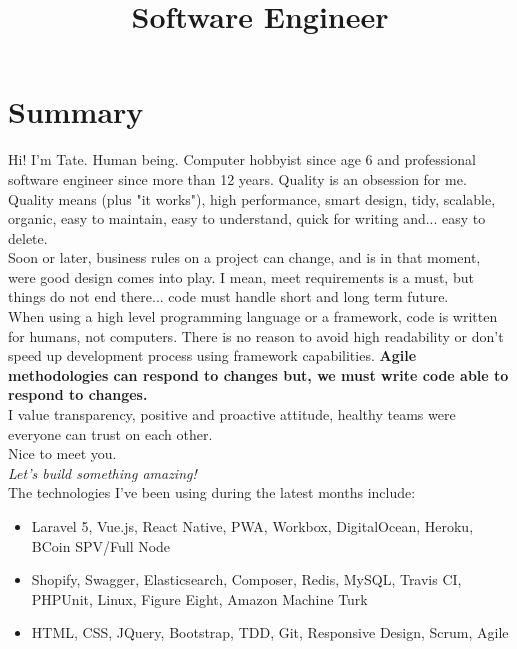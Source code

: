 \documentclass[11pt,a4paper,sans]{moderncv}        %
\title{Software Engineer}                               %
\begin{document}
\makecvtitle

\section{Summary}

Hi! I'm Tate. Human being. Computer hobbyist since age 6 and professional software engineer since more than 12 years.
Quality is an obsession for me. Quality means (plus "it works"), high performance, smart design, tidy, scalable, organic, easy to maintain, easy to understand, quick for writing and... easy to delete.\\

Soon or later, business rules on a project can change, and is in that moment, were good design comes into play.
I mean, meet requirements is a must, but things do not end there... code must handle short and long term future.\\

When using a high level programming language or a framework, code is written for humans, not computers. There is no reason to avoid high readability or don't speed up development process using framework capabilities.
\textbf{Agile methodologies can respond to changes but, we must write code able to respond to changes.}\\

I value transparency, positive and proactive attitude, healthy teams were everyone can trust on each other.\\

Nice to meet you.\\
\textit{Let's build something amazing!}\\

\medskip The technologies I've been using during the latest months include:
\begin{itemize}
  \item Laravel 5, Vue.js, React Native, PWA, Workbox, DigitalOcean, Heroku, BCoin SPV/Full Node
  \item Shopify, Swagger, Elasticsearch, Composer, Redis, MySQL, Travis CI, PHPUnit, Linux, Figure Eight, Amazon Machine Turk
  \item HTML, CSS, JQuery, Bootstrap, TDD, Git, Responsive Design, Scrum, Agile
\end{itemize}
\end{document}
